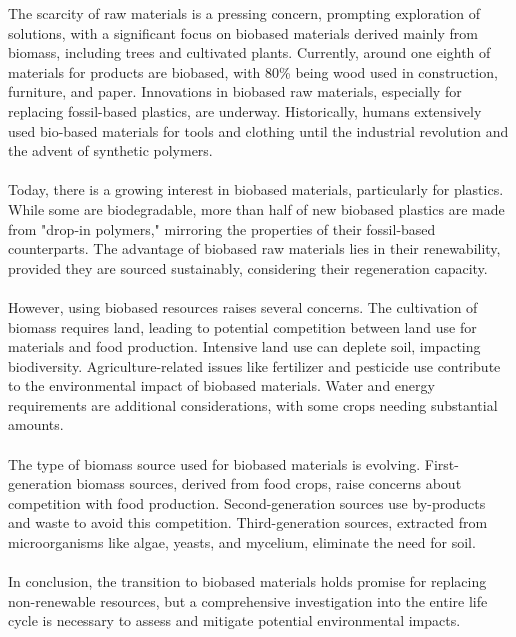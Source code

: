 \documentclass[../summary.tex]{subfiles}
\begin{document}
The scarcity of raw materials is a pressing concern, prompting exploration of solutions, with a significant focus on biobased materials derived mainly from biomass, including trees and cultivated plants. Currently, around one eighth of materials for products are biobased, with 80\% being wood used in construction, furniture, and paper. Innovations in biobased raw materials, especially for replacing fossil-based plastics, are underway. Historically, humans extensively used bio-based materials for tools and clothing until the industrial revolution and the advent of synthetic polymers.\\
\\
Today, there is a growing interest in biobased materials, particularly for plastics. While some are biodegradable, more than half of new biobased plastics are made from "drop-in polymers," mirroring the properties of their fossil-based counterparts. The advantage of biobased raw materials lies in their renewability, provided they are sourced sustainably, considering their regeneration capacity.\\
\\
However, using biobased resources raises several concerns. The cultivation of biomass requires land, leading to potential competition between land use for materials and food production. Intensive land use can deplete soil, impacting biodiversity. Agriculture-related issues like fertilizer and pesticide use contribute to the environmental impact of biobased materials. Water and energy requirements are additional considerations, with some crops needing substantial amounts.\\
\\
The type of biomass source used for biobased materials is evolving. First-generation biomass sources, derived from food crops, raise concerns about competition with food production. Second-generation sources use by-products and waste to avoid this competition. Third-generation sources, extracted from microorganisms like algae, yeasts, and mycelium, eliminate the need for soil.\\
\\
In conclusion, the transition to biobased materials holds promise for replacing non-renewable resources, but a comprehensive investigation into the entire life cycle is necessary to assess and mitigate potential environmental impacts.
\end{document}
